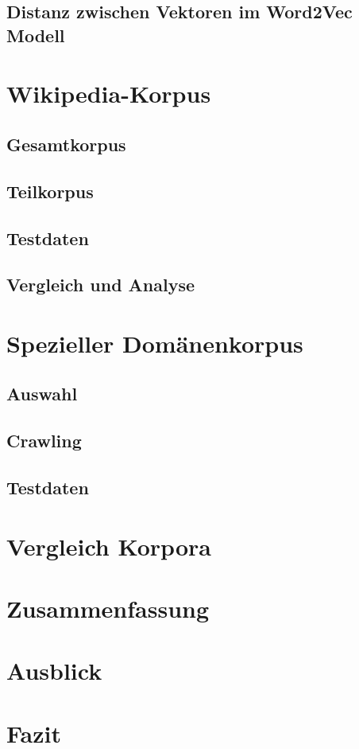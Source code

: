 \documentclass[11pt,a4paper]{article}
\begin{document}
	\subsection{Distanz zwischen Vektoren im Word2Vec Modell}
\section{Wikipedia-Korpus}
	\subsection{Gesamtkorpus}
	\subsection{Teilkorpus}
	\subsection{Testdaten}
	\subsection{Vergleich und Analyse}
\section{Spezieller Domänenkorpus}
	\subsection{Auswahl}
	\subsection{Crawling}
	\subsection{Testdaten}
\section{Vergleich Korpora}

\section{Zusammenfassung}
\section{Ausblick}
\section{Fazit}

	

	
	
\end{document}
